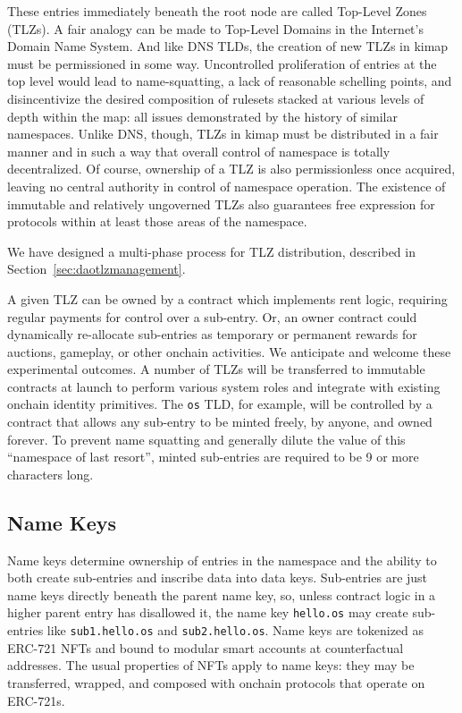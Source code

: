 \documentclass[runningheads]{llncs}
\begin{document}
These entries immediately beneath the root node are called Top-Level Zones (TLZs).
A fair analogy can be made to Top-Level Domains in the Internet's Domain Name System.
And like DNS TLDs, the creation of new TLZs in kimap must be permissioned in some way.
Uncontrolled proliferation of entries at the top level would lead to name-squatting, a lack of reasonable schelling points, and disincentivize the desired composition of rulesets stacked at various levels of depth within the map: all issues demonstrated by the history of similar namespaces.
Unlike DNS, though, TLZs in kimap must be distributed in a fair manner and in such a way that overall control of namespace is totally decentralized.
Of course, ownership of a TLZ is also permissionless once acquired, leaving no central authority in control of namespace operation.
The existence of immutable and relatively ungoverned TLZs also guarantees free expression for protocols within at least those areas of the namespace.

We have designed a multi-phase process for TLZ distribution, described in Section~\ref{sec:daotlzmanagement}.

A given TLZ can be owned by a contract which implements rent logic, requiring regular payments for control over a sub-entry.
Or, an owner contract could dynamically re-allocate sub-entries as temporary or permanent rewards for auctions, gameplay, or other onchain activities.
We anticipate and welcome these experimental outcomes.
A number of TLZs will be transferred to immutable contracts at launch to perform various system roles and integrate with existing onchain identity primitives.
The \verb|os| TLD, for example, will be controlled by a contract that allows any sub-entry to be minted freely, by anyone, and owned forever.
To prevent name squatting and generally dilute the value of this ``namespace of last resort'', minted sub-entries are required to be 9 or more characters long.

\subsection{Name Keys}

Name keys determine ownership of entries in the namespace and the ability to both create sub-entries and inscribe data into data keys. Sub-entries are just name keys directly beneath the parent name key, so, unless contract logic in a higher parent entry has disallowed it, the name key \verb|hello.os| may create sub-entries like \verb|sub1.hello.os| and \verb|sub2.hello.os|.
Name keys are tokenized as ERC-721 NFTs and bound to modular smart accounts at counterfactual addresses.
The usual properties of NFTs apply to name keys: they may be transferred, wrapped, and composed with onchain protocols that operate on ERC-721s.
\end{document}
